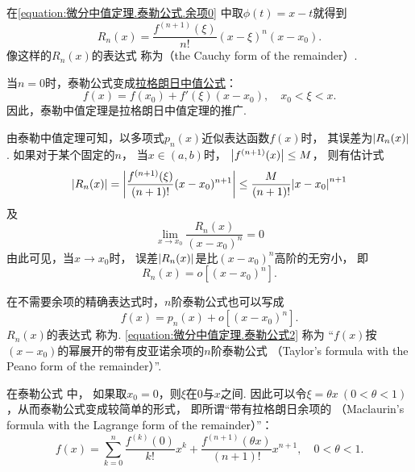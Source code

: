 在\cref{equation:微分中值定理.泰勒公式.余项0} 中取\(\phi(t) = x-t\)就得到
\begin{equation}\label{equation:微分中值定理.泰勒公式.余项4}
	R_n(x) = \frac{f^{(n+1)}(\xi)}{n!} (x-\xi)^n (x-x_0).
\end{equation}
像这样的\(R_n(x)\)的表达式 
称为（the Cauchy form of the remainder）.

当\(n=0\)时，泰勒公式变成\hyperref[equation:微分中值定理.拉格朗日中值公式]{拉格朗日中值公式}：\begin{equation*}
	f(x) = f(x_0) + f'(\xi) (x-x_0), \quad x_0 < \xi < x.
\end{equation*}
因此，泰勒中值定理是拉格朗日中值定理的推广.

由泰勒中值定理可知，以多项式\(p_n(x)\)近似表达函数\(f(x)\)时，
其误差为\(\abs{R_n(x)}\).
如果对于某个固定的\(n\)，
当\(x\in(a,b)\)时，
\(\abs{f^{(n+1)}(x)} \leq M\)，
则有估计式\begin{equation}\label{equation:微分中值定理.泰勒公式.误差1}
	\abs{R_n(x)}
	= \abs{\frac{f^{(n+1)}(\xi)}{(n+1)!} (x-x_0)^{n+1}}
	\leq \frac{M}{(n+1)!} \abs{x-x_0}^{n+1}
\end{equation}
及\begin{equation*}
	\lim_{x \to x_0} \frac{R_n(x)}{(x-x_0)^n} = 0
\end{equation*}
由此可见，当\(x \to x_0\)时，
误差\(\abs{R_n(x)}\)是比\((x-x_0)^n\)高阶的无穷小，
即\begin{equation}\label{equation:微分中值定理.泰勒公式.余项2}
	R_n(x) = o[(x-x_0)^n].
\end{equation}

在不需要余项的精确表达式时，\(n\)阶泰勒公式也可以写成
\begin{equation}\label{equation:微分中值定理.泰勒公式2}
	f(x) = p_n(x) + o[(x - x_0)^n].
\end{equation}
\(R_n(x)\)的表达式  称为.
\cref{equation:微分中值定理.泰勒公式2} 称为
“\(f(x)\)按\((x-x_0)\)的幂展开的带有皮亚诺余项的\(n\)阶泰勒公式
（Taylor's formula with the Peano form of the remainder）”.

在泰勒公式  中，
如果取\(x_0 = 0\)，则\(\xi\)在\(0\)与\(x\)之间.
因此可以令\(\xi = \theta x\ (0 < \theta < 1)\)，从而泰勒公式变成较简单的形式，
即所谓“带有拉格朗日余项的
（Maclaurin's formula with the Lagrange form of the remainder）”：
\begin{equation}\label{equation:微分中值定理.泰勒公式3}
	f(x)=\sum_{k=0}^n \frac{f^{(k)}(0)}{k!} x^k
		+ \frac{f^{(n+1)}(\theta x)}{(n+1)!} x^{n+1},
	\quad 0 < \theta < 1.
\end{equation}

